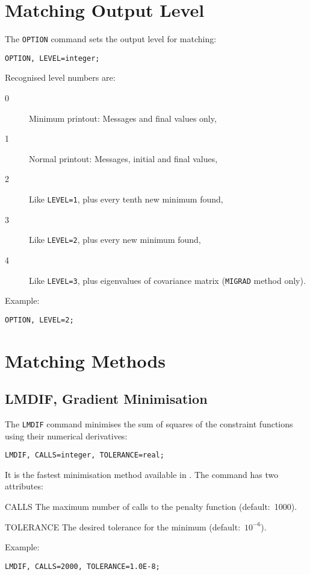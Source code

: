\section{Matching Output Level}
\label{sec:matchoption}
The \texttt{OPTION} command sets the output level for matching:
\begin{verbatim}
OPTION, LEVEL=integer;
\end{verbatim}
Recognised level numbers are:
\begin{description}
\item[0]
Minimum printout: Messages and final values only,
\item[1]
Normal printout: Messages, initial and final values,
\item[2]
Like \texttt{LEVEL=1}, plus every tenth new minimum found,
\item[3]
Like \texttt{LEVEL=2}, plus every new minimum found,
\item[4]
Like \texttt{LEVEL=3}, plus eigenvalues of covariance matrix
(\texttt{MIGRAD} method only).
\end{description}
Example:
\begin{verbatim}
OPTION, LEVEL=2;
\end{verbatim}

\section{Matching Methods}
\label{sec:matchmethod}

\subsection{LMDIF, Gradient Minimisation}
The \texttt{LMDIF} command minimises the sum of squares of the constraint
functions using their numerical derivatives:
\begin{verbatim}
LMDIF, CALLS=integer, TOLERANCE=real;
\end{verbatim}
It is the fastest minimisation method available in \opal.
The command has two attributes:
\begin{kdescription}
\item[CALLS]
  The maximum number of calls to the penalty function (default:~1000).
\item[TOLERANCE]
  The desired tolerance for the minimum (default:~\(10^{-6}\)).
\end{kdescription}
Example:
\begin{verbatim}
LMDIF, CALLS=2000, TOLERANCE=1.0E-8;
\end{verbatim}


